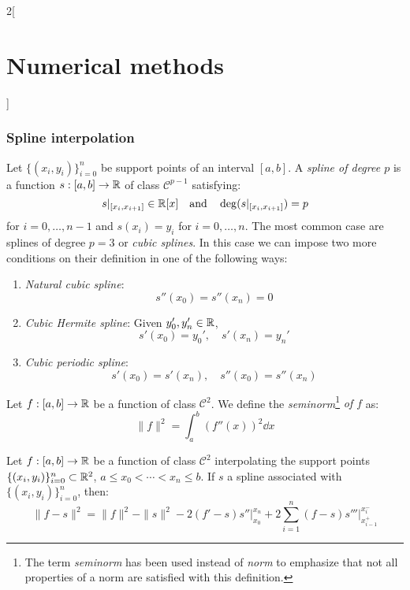 \documentclass[../../../main.tex]{subfiles}
\begin{document}
\begin{multicols}{2}[\section{Numerical methods}]
  \subsubsection{Spline interpolation}
  \begin{center}
    \begin{minipage}{\linewidth}
      \centering
      
    \end{minipage}
  \end{center}
  \begin{definition}[Spline]
    Let $\{(x_i,y_i)\}_{i=0}^n$ be support points of an interval $[a,b]$. A \textit{spline of degree $p$} is a function $s:[a,b]\rightarrow\mathbb{R}$ of class $\mathcal{C}^{p-1}$ satisfying: $$s|_{[x_i,x_{i+1}]}\in\mathbb{R}[x]\quad\text{and}\quad\deg (s|_{[x_i,x_{i+1}]})=p$$ for $i=0,\ldots,n-1$ and $s(x_i)=y_i$ for $i=0,\ldots,n$. The most common case are splines of degree  $p=3$ or \textit{cubic splines}. In this case we can impose two more conditions on their definition in one of the following ways:
    \begin{enumerate}
      \item \textit{Natural cubic spline}: $$s''(x_0)=s''(x_n)=0$$
      \item \textit{Cubic Hermite spline}: Given $y_0',y_n'\in\mathbb{R}$, $$s'(x_0)=y_0',\quad s'(x_n)=y_n'$$
      \item \textit{Cubic periodic spline}: $$s'(x_0)=s'(x_n),\quad s''(x_0)=s''(x_n)$$
    \end{enumerate}
  \end{definition}
  \begin{definition}
    Let $f:[a,b]\rightarrow\mathbb{R}$ be a function of class $\mathcal{C}^2$. We define the \textit{seminorm}\footnote{The term \textit{seminorm} has been used instead of \textit{norm} to emphasize that not all properties of a norm are satisfied with this definition.} \textit{of $f$} as: $$\|f\|^2=\int_a^b(f''(x))^2\dd x$$
  \end{definition}
  \begin{prop}
    Let $f:[a,b]\rightarrow\mathbb{R}$ be a function of class $\mathcal{C}^2$ interpolating the support points $\{(x_i,y_i)\}_{i=0}^n\subset\mathbb{R}^2$, $a\leq x_0<\cdots<x_n\leq b$. If $s$ a spline associated with $\{(x_i,y_i)\}_{i=0}^n$, then: $$\|f-s\|^2=\|f\|^2-\|s\|^2-2(f'-s)s''\Big|_{x_0}^{x_n}+2\sum_{i=1}^n(f-s)s'''\Big|_{x_{i-1}^+}^{x_i^-}$$

\end{prop}
\end{multicols}
\end{document}
